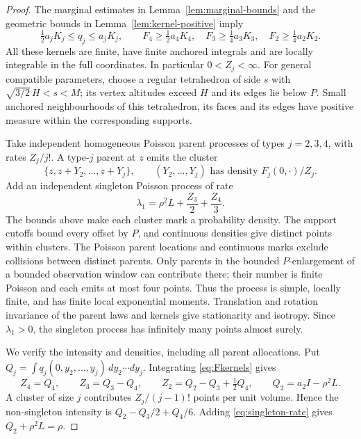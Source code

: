 \begin{proof}
The marginal estimates in Lemma~\ref{lem:marginal-bounds} and the geometric bounds in Lemma~\ref{lem:kernel-positive} imply
\[
 \tfrac12a_jK_j\leq q_j\leq a_jK_j,\qquad
 F_4\geq\tfrac12a_4K_4,\quad F_3\geq\tfrac14a_3K_3,\quad F_2\geq\tfrac14a_2K_2.
\]
All these kernels are finite, have finite anchored integrals and are locally integrable in the full coordinates. In particular $0<Z_j<\infty$. For general compatible parameters, choose a regular tetrahedron of side $s$ with $\sqrt{3/2}\,H<s<M$; its vertex altitudes exceed $H$ and its edges lie below $P$. Small anchored neighbourhoods of this tetrahedron, its faces and its edges have positive measure within the corresponding supports.

Take independent homogeneous Poisson parent processes of types $j=2,3,4$, with rates $Z_j/j!$. A type-$j$ parent at $z$ emits the cluster
\[
 \{z,z+Y_2,\ldots,z+Y_j\},\qquad
 (Y_2,\ldots,Y_j)\text{ has density }F_j(0,\cdot)/Z_j.
\]
Add an independent singleton Poisson process of rate
\begin{equation}
 \lambda_1=\rho^2L+\frac{Z_3}{2}+\frac{Z_4}{3}.
 \label{eq:singleton-rate}
\end{equation}
The bounds above make each cluster mark a probability density. The support cutoffs bound every offset by $P$, and continuous densities give distinct points within clusters. The Poisson parent locations and continuous marks exclude collisions between distinct parents. Only parents in the bounded $P$-enlargement of a bounded observation window can contribute there; their number is finite Poisson and each emits at most four points. Thus the process is simple, locally finite, and has finite local exponential moments. Translation and rotation invariance of the parent laws and kernels give stationarity and isotropy. Since $\lambda_1>0$, the singleton process has infinitely many points almost surely.

We verify the intensity and densities, including all parent allocations. Put $Q_j=\int q_j(0,y_2,\ldots,y_j)\,dy_2\cdots dy_j$. Integrating \eqref{eq:Fkernels} gives
\[
 Z_4=Q_4,\qquad Z_3=Q_3-Q_4,\qquad Z_2=Q_2-Q_3+\tfrac12Q_4,
 \qquad Q_2=a_2I-\rho^2L.
\]
A cluster of size $j$ contributes $Z_j/(j-1)!$ points per unit volume. Hence the non-singleton intensity is $Q_2-Q_3/2+Q_4/6$. Adding \eqref{eq:singleton-rate} gives $Q_2+\rho^2L=\rho$.


\end{proof}

